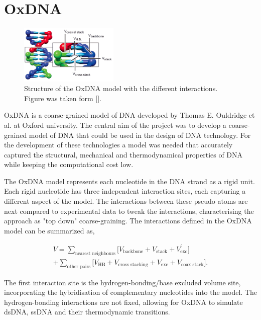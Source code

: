 \section{OxDNA}

\begin{figure}
  \begin{center}
    \includegraphics[width=0.42\textwidth]{Figures/oxDNA_model.png}
  \end{center}
  \caption{Structure of the OxDNA model with the different interactions.
          Figure was taken form [].}
\end{figure}

OxDNA is a coarse-grained model of DNA developed by Thomas E. Ouldridge et al. at Oxford
university. The central aim of the project was to develop a coarse-grained model of DNA
that could be used in the design of DNA technology. For the development of these
technologies a model was needed that accurately captured the structural, mechanical and
thermodynamical properties of DNA while keeping the computational cost low.

The OxDNA model represents each nucleotide in the DNA strand as a rigid unit. Each rigid
nucleotide has three independent interaction sites, each capturing a different aspect of
the model. The interactions between these pseudo atoms are next compared to experimental
data to tweak the interactions, characterising the approach as "top down"
coarse-graining. The interactions defined in the OxDNA model can be summarized as,

\begin{equation}
  \begin{aligned}
    V = \sum_{\text{nearest neighbours}} \bigg[ V_{\text{backbone}} + V_{\text{stack}} +
    V^{'}_{\text{exc}}\bigg]\\
    + \sum_{\text{other pairs}} \bigg[V_{\text{HB}} + V_{\text{cross stacking}} +
    V_{\text{exc}} + V_{\text{coax stack}}\bigg].
  \end{aligned}
\end{equation}

The first interaction site is the hydrogen-bonding/base excluded volume site,
incorporating the hybridisation of complementary nucleotides into the model. The
hydrogen-bonding interactions are not fixed, allowing for OxDNA to simulate dsDNA, ssDNA
and their thermodynamic transitions.

